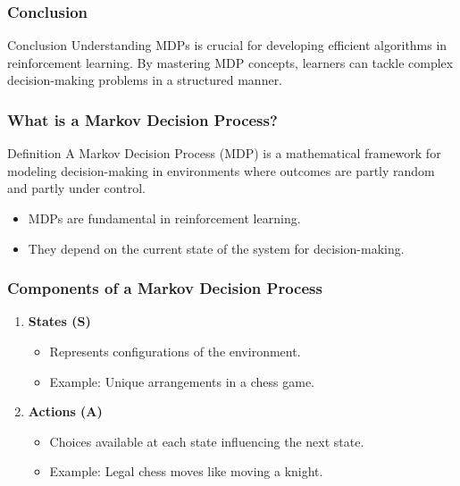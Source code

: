\documentclass[aspectratio=169]{beamer}
\begin{document}
\begin{frame}[fragile]
    \frametitle{Conclusion}
    \begin{block}{Conclusion}
        Understanding MDPs is crucial for developing efficient algorithms in reinforcement learning. By mastering MDP concepts, learners can tackle complex decision-making problems in a structured manner.
    \end{block}
\end{frame}

\begin{frame}[fragile]
    \frametitle{What is a Markov Decision Process?}
    \begin{block}{Definition}
        A Markov Decision Process (MDP) is a mathematical framework for modeling decision-making in environments where outcomes are partly random and partly under control.
    \end{block}
    \begin{itemize}
        \item MDPs are fundamental in reinforcement learning.
        \item They depend on the current state of the system for decision-making.
    \end{itemize}
\end{frame}

\begin{frame}[fragile]
    \frametitle{Components of a Markov Decision Process}
    \begin{enumerate}
        \item \textbf{States (S)}
        \begin{itemize}
            \item Represents configurations of the environment.
            \item Example: Unique arrangements in a chess game.
        \end{itemize}

        \item \textbf{Actions (A)}
        \begin{itemize}
            \item Choices available at each state influencing the next state.
            \item Example: Legal chess moves like moving a knight.
        \end{itemize}
    \end{enumerate}
\end{frame}
\end{document}
